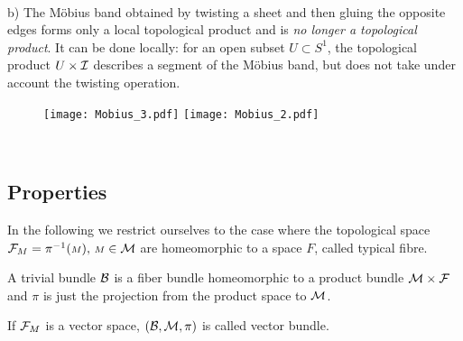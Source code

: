 \,


b) The M\"obius band obtained by twisting a sheet and then gluing the opposite edges forms only a local topological product and is {\it no longer a topological product}. It can be done locally: for an open subset $U\subset S^1$, the topological product $U \times \mathcal{I}$ describes a segment of the  M\"obius band, but does not take under account  the twisting operation.

\begin{figure}[h]
\texttt{[image: Mobius\_3.pdf]}
  \hspace{0.3cm}\texttt{[image: Mobius\_2.pdf]}
 \end{figure}

\,

\subsection{Properties}
In the following we restrict ourselves to the case  where the topological space $\mathcal{F}_{\scriptstyle M}= \pi^{-1}({\scriptstyle M}), \, {\scriptstyle M}\in \mathcal{M}$ are  homeomorphic to a space $F$, called typical fibre.


\begin{definition}
A trivial bundle $\mathcal{B}$ is a fiber bundle homeomorphic to a product bundle $\mathcal{M}\times \mathcal{F}$ and
$ \pi $ is just the projection from the product space to $\mathcal{M}$.
\end{definition}



\begin{definition}	
	\noindent If $\mathcal{F}_M$ is a vector space, $(\mathcal{B},\mathcal{M},\pi)$ is  called vector bundle.
\end{definition}

